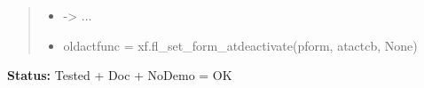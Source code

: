 \begin{boxedminipage}{\funcwidth}
\begin{quote}
\begin{itemize}
  \item {\textbar}-{\textgreater}{\textbar} ...



  \item oldactfunc = xf.fl\_set\_form\_atdeactivate(pform, atactcb, None)



\end{itemize}

\end{quote}

\textbf{Status:} Tested + Doc + NoDemo = OK



    \end{boxedminipage}

    \label{xformslib:flbasic:fl_set_form_atdeactivate}

    \vspace{0.5ex}

